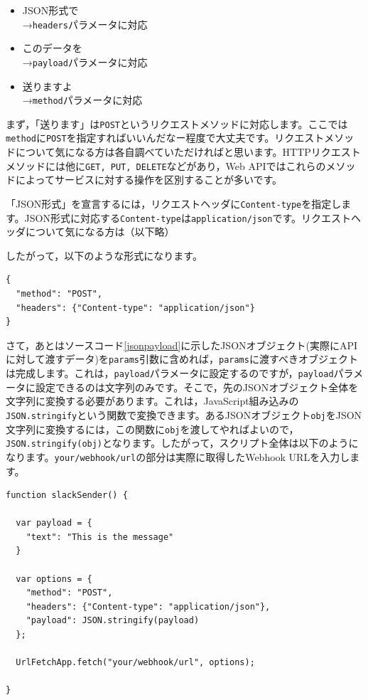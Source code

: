 \documentclass[uplatex,a4j]{jsarticle}
\begin{document}
\begin{itemize}
\item JSON形式で\\
→\verb|headers|パラメータに対応
\item このデータを\\
→\verb|payload|パラメータに対応
\item 送りますよ\\
→\verb|method|パラメータに対応
\end{itemize}


まず，「送ります」は\verb|POST|というリクエストメソッドに対応します。ここでは\verb|method|に\verb|POST|を指定すればいいんだなー程度で大丈夫です。リクエストメソッドについて気になる方は各自調べていただければと思います。HTTPリクエストメソッドには他に\verb|GET, PUT, DELETE|などがあり，Web APIではこれらのメソッドによってサービスに対する操作を区別することが多いです。


「JSON形式」を宣言するには，リクエストヘッダに\verb|Content-type|を指定します。JSON形式に対応する\verb|Content-type|は\verb|application/json|です。リクエストヘッダについて気になる方は（以下略）


したがって，以下のような形式になります。

\begin{lstlisting}[basicstyle=\ttfamily\footnotesize,frame=single,caption=params argument for UrlFetchApp]
{
  "method": "POST",
  "headers": {"Content-type": "application/json"}
}
\end{lstlisting}

さて，あとはソースコード\ref{jsonpayload}に示したJSONオブジェクト(実際にAPIに対して渡すデータ)を\verb|params|引数に含めれば，\verb|params|に渡すべきオブジェクトは完成します。これは，\verb|payload|パラメータに設定するのですが，\verb|payload|パラメータに設定できるのは文字列のみです。そこで，先のJSONオブジェクト全体を文字列に変換する必要があります。これは，JavaScript組み込みの\verb|JSON.stringify|という関数で変換できます。あるJSONオブジェクト\verb|obj|をJSON文字列に変換するには，この関数に\verb|obj|を渡してやればよいので，\verb|JSON.stringify(obj)|となります。したがって，スクリプト全体は以下のようになります。\verb|your/webhook/url|の部分は実際に取得したWebhook URLを入力します。

\begin{lstlisting}[basicstyle=\ttfamily\footnotesize,frame=single,caption=Incoming Webhooks Sample]
function slackSender() {
  
  var payload = {
    "text": "This is the message"
  }
  
  var options = {
    "method": "POST",
    "headers": {"Content-type": "application/json"},
    "payload": JSON.stringify(payload)
  };
        
  UrlFetchApp.fetch("your/webhook/url", options);
  
}
\end{lstlisting}
\end{document}
